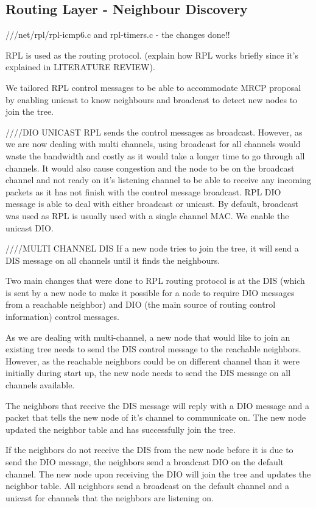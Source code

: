 \subsection{Routing Layer - Neighbour Discovery}
///net/rpl/rpl-icmp6.c and rpl-timers.c - the changes done!!

RPL is used as the routing protocol. (explain how RPL works briefly since it's explained in LITERATURE REVIEW).

We tailored RPL control messages to be able to accommodate MRCP proposal by enabling unicast to know neighbours and broadcast to detect new nodes to join the tree.  

////DIO UNICAST
RPL sends the control messages as broadcast. However, as we are now dealing with multi channels, using broadcast for all channels would waste the bandwidth and costly as it would take a longer time to go through all channels. It would also cause congestion and the node to be on the broadcast channel and not ready on it's listening channel to be able to receive any incoming packets as it has not finish with the control message broadcast. RPL DIO message is able to deal with either broadcast or unicast. By default, broadcast was used as RPL is usually used with a single channel MAC. We enable the unicast DIO.

////MULTI CHANNEL DIS
If a new node tries to join the tree, it will send a DIS message on all channels until it finds the neighbours. 

Two main changes that were done to RPL routing protocol is at the DIS (which is sent by a new node to make it possible for a node to require DIO messages from a reachable neighbor) and DIO (the main source of routing control information) control messages.

As we are dealing with multi-channel, a new node that would like to join an existing tree needs to send the DIS control message to the reachable neighbors. However, as the reachable neighbors could be on different channel than it were initially during start up, the new node needs to send the DIS message on all channels available. 

The neighbors that receive the DIS message will reply with a DIO message and a packet that tells the new node of it's channel to communicate on. The new node updated the neighbor table and has successfully join the tree. 

If the neighbors do not receive the DIS from the new node before it is due to send the DIO message, the neighbors send a broadcast DIO on the default channel. The new node upon receiving the DIO will join the tree and updates the neighbor table. All neighbors send a broadcast on the default channel and a unicast for channels that the neighbors are listening on. 

